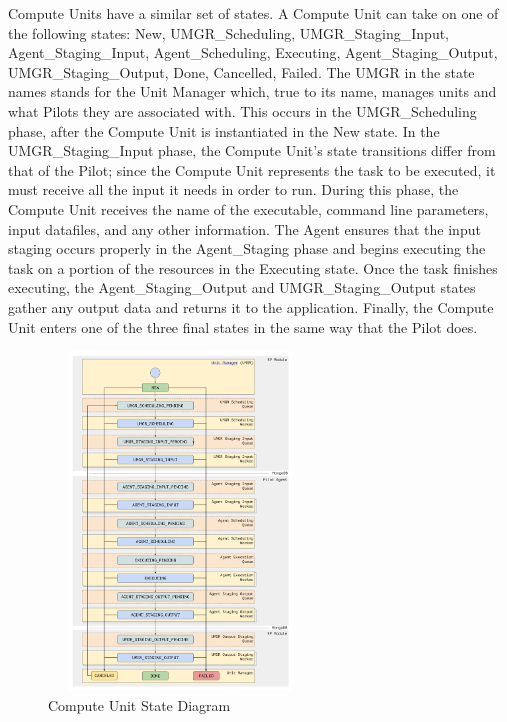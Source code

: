 \documentclass[conference]{IEEEtran}
\begin{document}
Compute Units have a similar set of states. A Compute Unit can take on one of the following states: New, UMGR\_Scheduling, UMGR\_Staging\_Input, Agent\_Staging\_Input, Agent\_Scheduling, Executing, Agent\_Staging\_Output, UMGR\_Staging\_Output, Done, Cancelled, Failed. The UMGR in the state names stands for the Unit Manager which, true to its name, manages units and what Pilots they are associated with. This occurs in the UMGR\_Scheduling phase, after the Compute Unit is instantiated in the New state. In the UMGR\_Staging\_Input phase, the Compute Unit's state transitions differ from that of the Pilot; since the Compute Unit represents the task to be executed, it must receive all the input it needs in order to run. During this phase, the Compute Unit receives the name of the executable, command line parameters, input datafiles, and any other information. The Agent ensures that the input staging occurs properly in the Agent\_Staging phase and begins executing the task on a portion of the resources in the Executing state. Once the task finishes executing, the Agent\_Staging\_Output and UMGR\_Staging\_Output states gather any output data and returns it to the application. Finally, the Compute Unit enters one of the three final states in the same way that the Pilot does. 


\begin{figure}[h]
\caption{Compute Unit State Diagram}
\centering
\includegraphics[width=7cm,height=9cm]{unit-state-model}
\end{figure}




\end{document}
